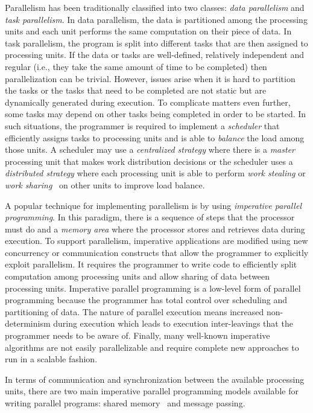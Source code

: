 Parallelism has been traditionally classified into two classes: \emph{data
parallelism} and \emph{task parallelism}. In data parallelism, the data is
partitioned among the processing units and each unit performs the same
computation on their piece of data. In task parallelism, the program is split
into different tasks that are then assigned to processing units. If the data or
tasks are well-defined, relatively independent and regular (i.e., they take the
same amount of time to be completed) then parallelization can be trivial.
However, issues arise when it is hard to partition the tasks or the tasks that
need to be completed are not static but are dynamically generated during
execution. To complicate matters even further, some tasks may depend on other
tasks being completed in order to be started. In such situations, the programmer
is required to implement a \emph{scheduler} that efficiently assigns tasks to
processing units and is able to \emph{balance} the load among those units. A
scheduler may use a \emph{centralized strategy} where there is a \emph{master}
processing unit that makes work distribution decisions or the scheduler uses a
\emph{distributed strategy} where each processing unit is able to perform
\emph{work stealing} or \emph{work sharing}~\cite{Blumofe:1999} on other units
to improve load balance.

A popular technique for implementing parallelism is by using \emph{imperative
parallel programming}. In this paradigm, there is a sequence of steps that the
processor must do and a \emph{memory area} where the processor stores and
retrieves data during execution. To support parallelism, imperative applications
are modified using new concurrency or communication constructs that allow the
programmer to explicitly exploit parallelism. It requires the programmer to
write code to efficiently split computation among processing units and allow
sharing of data between processing units. Imperative parallel programming is a
low-level form of parallel programming because the programmer has total control
over scheduling and partitioning of data. The nature of parallel execution means
increased non-determinism during execution which leads to execution
inter-leavings that the programmer needs to be aware of. Finally, many
well-known imperative algorithms are not easily parallelizable and require
complete new approaches to run in a scalable fashion.

In terms of communication and synchronization between the available processing
units, there are two main imperative parallel programming models available for
writing parallel programs: shared memory~\cite{Mellor-Crummey:1991} and message
passing.

